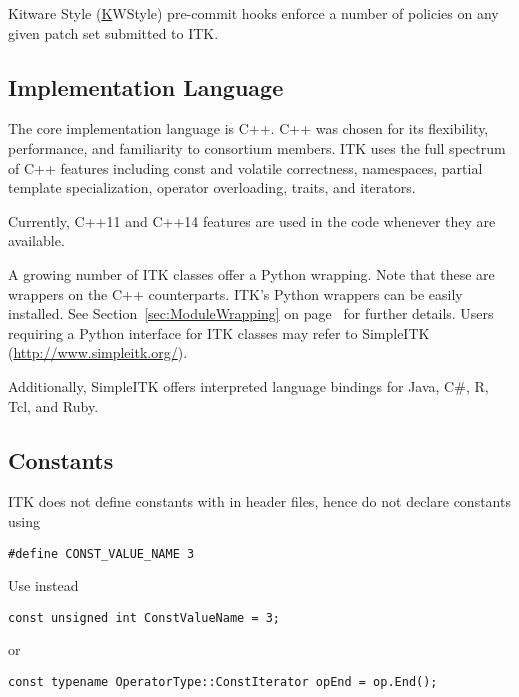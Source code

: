Kitware Style (\href{https://kitware.github.io/KWStyle/} KWStyle) pre-commit
hooks enforce a number of policies on any given patch set submitted to ITK.


\subsection{Implementation Language}
\label{subsec:ImplementationLanguage}

The core implementation language is C++. C++ was chosen for its flexibility,
performance, and familiarity to consortium members. ITK uses the full spectrum
of C++ features including const and volatile correctness, namespaces, partial
template specialization, operator overloading, traits, and iterators.

Currently, C++11 and C++14 features are used in the code whenever they are
available.

A growing number of ITK classes offer a Python wrapping. Note that these are
wrappers on the C++ counterparts. ITK's Python wrappers can be easily installed.
See Section~\ref{sec:ModuleWrapping} on page~\pageref{sec:ModuleWrapping} for
further details. Users requiring a Python interface for ITK classes may refer to
SimpleITK (\href{http://www.simpleitk.org/}{http://www.simpleitk.org/}).

Additionally, SimpleITK offers interpreted language bindings for Java, C\#, R,
Tcl, and Ruby.


\subsection{Constants}
\label{subsec:Constants}

ITK does not define constants with  in header files, hence do not
declare constants using
\small
\begin{verbatim}
#define CONST_VALUE_NAME 3
\end{verbatim}
\normalsize

Use instead

\small
\begin{verbatim}
const unsigned int ConstValueName = 3;
\end{verbatim}
\normalsize

or

\small
\begin{verbatim}
const typename OperatorType::ConstIterator opEnd = op.End();
\end{verbatim}
\normalsize

